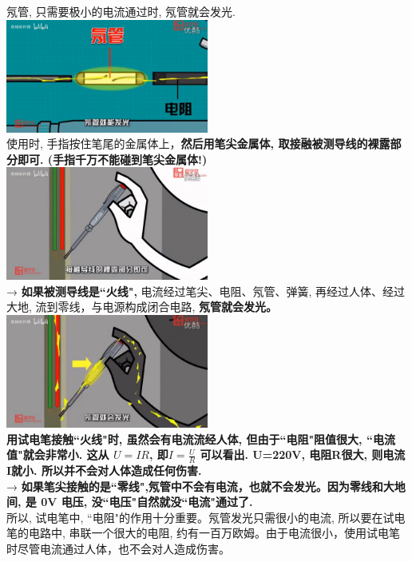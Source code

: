 \documentclass[UTF8]{ctexart}
\begin{document}
氖管, 只需要极小的电流通过时, 氖管就会发光. \\
\includegraphics[width=0.5\textwidth]{img/0069.png}  \\

使用时, 手指按住笔尾的金属体上，\textbf{然后用笔尖金属体, 取接融被测导线的裸露部分即可. (手指千万不能碰到笔尖金属体!)} \\
\includegraphics[width=0.5\textwidth]{img/0070.png}  \\

→ \textbf{如果被测导线是``火线", }电流经过笔尖、电阻、氖管、弹簧, 再经过人体、经过大地, 流到零线，与电源构成闭合电路, \textbf{氖管就会发光。} \\
\includegraphics[width=0.5\textwidth]{img/0071.png}  \\
\textbf{用试电笔接触``火线"时, 虽然会有电流流经人体, 但由于``电阻"阻值很大, ``电流值"就会非常小. 这从 $U=IR$, 即$I=\frac{U} {R}$ 可以看出. U=220V, 电阻R很大, 则电流I就小. 所以并不会对人体造成任何伤害.} \\

→ \textbf{如果笔尖接触的是``零线",氖管中不会有电流，也就不会发光。因为零线和大地间, 是 0V 电压, 没``电压"自然就没``电流"通过了. } \\


所以, 试电笔中, ``电阻"的作用十分重要。氖管发光只需很小的电流, 所以要在试电笔的电路中, 串联一个很大的电阻, 约有一百万欧姆。由于电流很小，使用试电笔时尽管电流通过人体，也不会对人造成伤害。 \\
\end{document}
